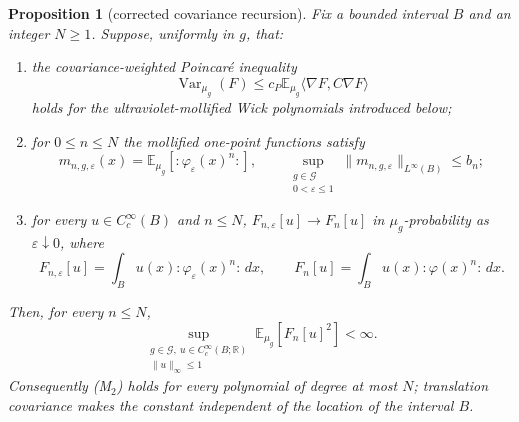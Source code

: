 \documentclass[11pt,a4paper]{article}
\newtheorem{proposition}[theorem]{Proposition}
\theoremstyle{remark}
\newcommand{\R}{\mathbb R}
\newcommand{\G}{\mathcal G}
\newcommand{\E}{\mathbb E}
\DeclareMathOperator{\Var}{Var}
\begin{document}
\begin{proposition}[corrected covariance recursion]\label{prop:recursion}
Fix a bounded interval $B$ and an integer $N\ge1$.  Suppose, uniformly in $g$, that:
\begin{enumerate}
\item the covariance-weighted Poincar\'e inequality
\[
 \Var_{\mu_g}(F)\le c_P\E_{\mu_g}\langle\nabla F,C\nabla F\rangle
\]
holds for the ultraviolet-mollified Wick polynomials introduced below;
\item for $0\le n\le N$ the mollified one-point functions satisfy
\[
 m_{n,g,\varepsilon}(x)=
 \E_{\mu_g}\!\left[:\varphi_\varepsilon(x)^n:\right],
 \qquad
 \sup_{\substack{g\in\G\\0<\varepsilon\le1}}
 \|m_{n,g,\varepsilon}\|_{L^\infty(B)}\le b_n;
\]
\item for every $u\in C_c^\infty(B)$ and $n\le N$,
$F_{n,\varepsilon}[u]\to F_n[u]$ in $\mu_g$-probability as $\varepsilon\downarrow0$, where
\[
 F_{n,\varepsilon}[u]=\int_Bu(x):\varphi_\varepsilon(x)^n:\,dx,
 \qquad
 F_n[u]=\int_Bu(x):\varphi(x)^n:\,dx.
\]
\end{enumerate}
Then, for every $n\le N$,
\[
 \sup_{\substack{g\in\G,\ u\in C_c^\infty(B;\R)\\\|u\|_\infty\le1}}
 \E_{\mu_g}[F_n[u]^2]<\infty.
\]
Consequently (M$_2$) holds for every polynomial of degree at most $N$; translation covariance
makes the constant independent of the location of the interval $B$.
\end{proposition}
\end{document}
